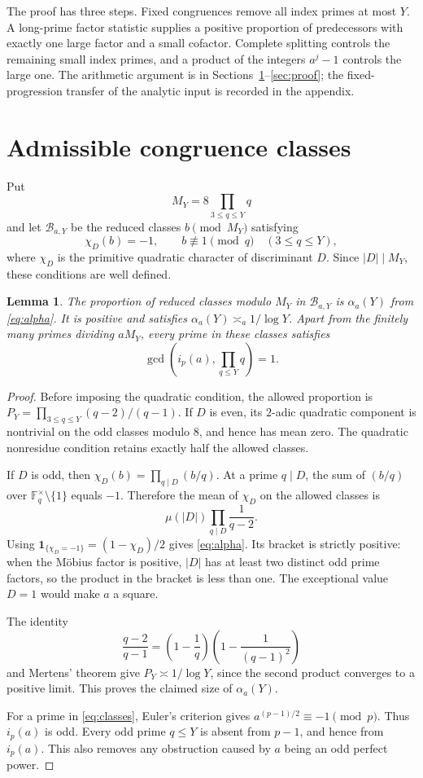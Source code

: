 \documentclass[11pt]{article}
\newtheorem{lemma}[theorem]{Lemma}
\theoremstyle{remark}
\newcommand{\1}{\mathbf 1}
\newcommand{\B}{\mathcal B}
\begin{document}
The proof has three steps.  Fixed congruences remove all index
primes at most $Y$.  A long-prime factor statistic supplies a
positive proportion of predecessors with exactly one large factor
and a small cofactor.  Complete splitting controls the remaining
small index primes, and a product of the integers $a^j-1$ controls
the large one.  The arithmetic argument is in
Sections~\ref{sec:local}--\ref{sec:proof}; the fixed-progression
transfer of the analytic input is recorded in the appendix.

\section{Admissible congruence classes}\label{sec:local}

Put
\[
 M_Y=8\prod_{3\le q\le Y}q
\]
and let $\B_{a,Y}$ be the reduced classes $b\pmod {M_Y}$ satisfying
\begin{equation}\label{eq:classes}
 \chi_D(b)=-1,\qquad
 b\not\equiv1\pmod q\quad(3\le q\le Y),
\end{equation}
where $\chi_D$ is the primitive quadratic character of discriminant
$D$.  Since $|D|\mid M_Y$, these conditions are well defined.

\begin{lemma}\label{lem:classes}
The proportion of reduced classes modulo $M_Y$ in $\B_{a,Y}$ is
$\alpha_a(Y)$ from \eqref{eq:alpha}.  It is positive and satisfies
$\alpha_a(Y)\asymp_a1/\log Y$.  Apart from the finitely many primes
dividing $aM_Y$, every prime in these classes satisfies
\[
 \gcd\!\left(i_p(a),\prod_{q\le Y}q\right)=1.
\]
\end{lemma}

\begin{proof}
Before imposing the quadratic condition, the allowed proportion is
$P_Y=\prod_{3\le q\le Y}(q-2)/(q-1)$.  If $D$ is even, its
$2$-adic quadratic component is nontrivial on the odd classes
modulo $8$, and hence has mean zero.  The quadratic nonresidue
condition retains exactly half the allowed classes.

If $D$ is odd, then
$\chi_D(b)=\prod_{q\mid D}(b/q)$.  At a prime $q\mid D$, the
sum of $(b/q)$ over $\mathbb F_q^\times\setminus\{1\}$ equals
$-1$.  Therefore the mean of $\chi_D$ on the allowed classes is
\[
 \mu(|D|)\prod_{q\mid D}\frac1{q-2}.
\]
Using $\1_{\{\chi_D=-1\}}=(1-\chi_D)/2$ gives
\eqref{eq:alpha}.  Its bracket is strictly positive: when the
M\"obius factor is positive, $|D|$ has at least two distinct
odd prime factors, so the product in the bracket is less than
one.  The exceptional value $D=1$ would make $a$ a square.

The identity
\[
 \frac{q-2}{q-1}
 =\left(1-\frac1q\right)
  \left(1-\frac1{(q-1)^2}\right)
\]
and Mertens' theorem give $P_Y\asymp1/\log Y$, since the second
product converges to a positive limit.  This proves the claimed
size of $\alpha_a(Y)$.

For a prime in \eqref{eq:classes}, Euler's criterion gives
$a^{(p-1)/2}\equiv-1\pmod p$.  Thus $i_p(a)$ is odd.  Every
odd prime $q\le Y$ is absent from $p-1$, and hence from $i_p(a)$.
This also removes any obstruction caused by $a$ being an odd
perfect power.
\end{proof}
\end{document}
